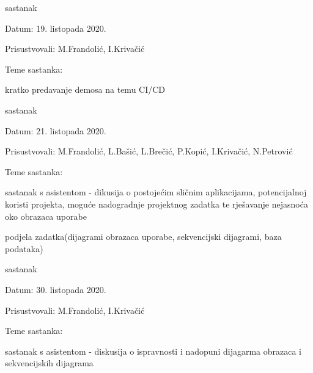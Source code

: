\begin{packed_enum}
			\item  sastanak
			\item[] \begin{packed_item}
				\item Datum: 19. listopada 2020.
				\item Prisustvovali: M.Frandolić, I.Krivačić
				\item Teme sastanka:
				\begin{packed_item}
					\item kratko predavanje demosa na temu CI/CD
				\end{packed_item}
			\end{packed_item}
			\newpage
			\item sastanak
			\item[] \begin{packed_item}
				\item Datum: 21. listopada 2020.
				\item Prisustvovali: M.Frandolić, L.Bašić, L.Brečić, P.Kopić, I.Krivačić, N.Petrović
				\item Teme sastanka:
				\begin{packed_item}
					\item sastanak s asistentom - dikusija o postojećim sličnim aplikacijama, potencijalnoj koristi projekta, moguće nadogradnje projektnog zadatka te rješavanje nejasnoća oko obrazaca uporabe
					\item podjela zadatka(dijagrami obrazaca uporabe, sekvencijski dijagrami, baza podataka)
				\end{packed_item}
			\end{packed_item}
		
			\item sastanak
			\item[] \begin{packed_item}
				\item Datum: 30. listopada 2020.
				\item Prisustvovali: M.Frandolić, I.Krivačić
				\item Teme sastanka:
				\begin{packed_item}
					\item sastanak s asistentom - diskusija o ispravnosti i nadopuni dijagarma obrazaca i sekvencijskih dijagrama
				\end{packed_item}
			\end{packed_item}
			

\end{packed_enum}
